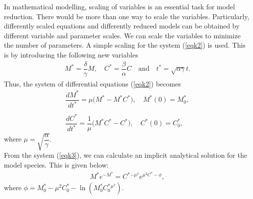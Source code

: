 \documentclass[a4paper,12pt]{article}
\begin{document}
\noindent In mathematical modelling, scaling of variables is an essential task for model reduction. There would be more than one way to scale the variables. Particularly, differently scaled equations and differently reduced models can be obtained by different variable and parameter scales. We can scale the variables to minimize the number of parameters. A simple scaling for the system (\ref{eqk2}) is used. This is by introducing the following new variables 
\begin{gather*}
M^{*}=\dfrac{\delta}{\gamma}M, \quad C^{*}=\dfrac{\beta}{\alpha}C \quad \text{and}\quad t^{*}=\sqrt{\alpha \gamma}t .  
\end{gather*}
Thus, the system of differential equations (\ref{eqk2}) becomes
 \begin{equation}
\begin{array}{llll}  
\dfrac{d M^{*}}{dt^{*}}=\mu \big(M^{*} -M^{*} C^{*}  \big),\quad M^{*}(0)=M^{*}_{0},\\
\\
\dfrac{d C^{*}}{dt^{*}}=\dfrac{1}{\mu} \big(M^{*} C^{*} - C^{*} \big),\quad  C^{*}(0)=C^{*}_{0},
\end{array}
\label{eqk3} 
 \end{equation}
where $\mu=\sqrt{\dfrac{\alpha}{\gamma}}.$  \\
From the system (\ref{eqk3}), we can calculate an implicit analytical solution for the model  
species. This is given below:
 \begin{equation}
\begin{array}{llll}    
M^{*} e^{-M^{*}}=C^{*}{^{-\mu^{2}}}e^{\mu^{2} C^{*} -\phi},
\end{array}
\label{eqk4}   
 \end{equation}
where  $\phi=M^{*}_{0}-\mu^{2}C^{*}_{0} -\ln(M^{*}_{0} C^{*}_{0}{^{\mu^{2}}})$. 
\end{document}
